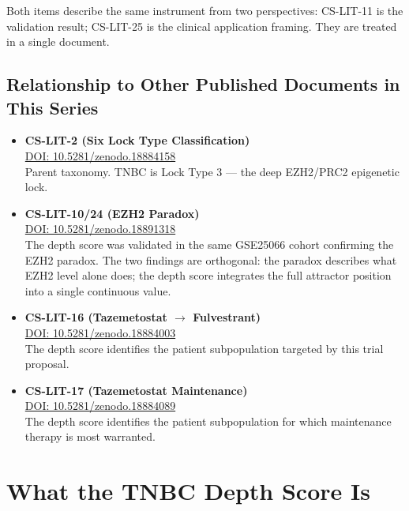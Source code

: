 \documentclass[12pt, a4paper]{article}
\begin{document}
Both items describe the same instrument from two
perspectives: CS-LIT-11 is the validation result;
CS-LIT-25 is the clinical application framing.
They are treated in a single document.

\subsection{Relationship to Other Published Documents
in This Series}

\begin{itemize}
    \item \textbf{CS-LIT-2 (Six Lock Type
    Classification)}\\
    \href{https://doi.org/10.5281/zenodo.18884158}
    {DOI: 10.5281/zenodo.18884158}\\
    Parent taxonomy. TNBC is Lock Type 3 ---
    the deep EZH2/PRC2 epigenetic lock.

    \item \textbf{CS-LIT-10/24 (EZH2 Paradox)}\\
    \href{https://doi.org/10.5281/zenodo.18891318}
    {DOI: 10.5281/zenodo.18891318}\\
    The depth score was validated in the same
    GSE25066 cohort confirming the EZH2 paradox.
    The two findings are orthogonal: the paradox
    describes what EZH2 level alone does; the
    depth score integrates the full attractor
    position into a single continuous value.

    \item \textbf{CS-LIT-16 (Tazemetostat
    $\rightarrow$ Fulvestrant)}\\
    \href{https://doi.org/10.5281/zenodo.18884003}
    {DOI: 10.5281/zenodo.18884003}\\
    The depth score identifies the patient
    subpopulation targeted by this trial proposal.

    \item \textbf{CS-LIT-17 (Tazemetostat
    Maintenance)}\\
    \href{https://doi.org/10.5281/zenodo.18884089}
    {DOI: 10.5281/zenodo.18884089}\\
    The depth score identifies the patient
    subpopulation for which maintenance therapy
    is most warranted.
\end{itemize}

\section{What the TNBC Depth Score Is}
\end{document}

